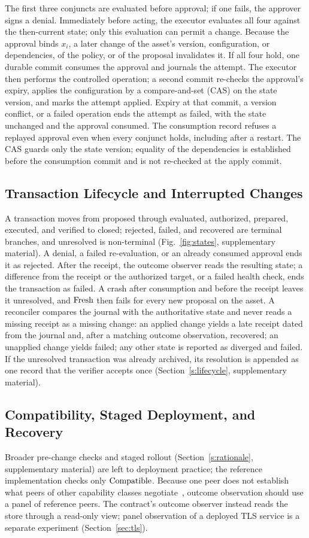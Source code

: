The first three conjuncts are evaluated before approval; if one fails, the approver signs a denial. Immediately before acting, the executor evaluates all four against the then-current state; only this evaluation can permit a change. Because the approval binds $x_i$, a later change of the asset's version, configuration, or dependencies, of the policy, or of the proposal invalidates it. If all four hold, one durable commit consumes the approval and journals the attempt. The executor then performs the controlled operation; a second commit re-checks the approval's expiry, applies the configuration by a compare-and-set (CAS) on the state version, and marks the attempt applied. Expiry at that commit, a version conflict, or a failed operation ends the attempt as failed, with the state unchanged and the approval consumed. The consumption record refuses a replayed approval even when every conjunct holds, including after a restart. The CAS guards only the state version; equality of the dependencies is established before the consumption commit and is not re-checked at the apply commit.

\subsection{Transaction Lifecycle and Interrupted Changes}
\label{sec:lifecycle}
A transaction moves from proposed through evaluated, authorized, prepared, executed, and verified to closed; rejected, failed, and recovered are terminal branches, and unresolved is non-terminal (Fig.~\ref{fig:states}, supplementary material). A denial, a failed re-evaluation, or an already consumed approval ends it as rejected. After the receipt, the outcome observer reads the resulting state; a difference from the receipt or the authorized target, or a failed health check, ends the transaction as failed. A crash after consumption and before the receipt leaves it unresolved, and $\mathrm{Fresh}$ then fails for every new proposal on the asset. A reconciler compares the journal with the authoritative state and never reads a missing receipt as a missing change: an applied change yields a late receipt dated from the journal and, after a matching outcome observation, recovered; an unapplied change yields failed; any other state is reported as diverged and failed. If the unresolved transaction was already archived, its resolution is appended as one record that the verifier accepts once (Section~\ref{s:lifecycle}, supplementary material).

\subsection{Compatibility, Staged Deployment, and Recovery}
\label{sec:recovery}
Broader pre-change checks and staged rollout (Section~\ref{s:rationale}, supplementary material) are left to deployment practice; the reference implementation checks only $\mathrm{Compatible}$. Because one peer does not establish what peers of other capability classes negotiate~\cite{han}, outcome observation should use a panel of reference peers. The contract's outcome observer instead reads the store through a read-only view; panel observation of a deployed TLS service is a separate experiment (Section~\ref{sec:tls}).

